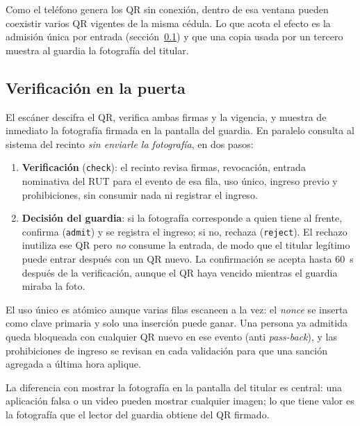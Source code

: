 Como el teléfono genera los QR sin conexión, dentro de esa ventana pueden coexistir varios QR
vigentes de la misma cédula. Lo que acota el efecto es la admisión única por entrada
(sección~\ref{sec:prototipo-verificacion}) y que una copia usada por un tercero muestra al guardia
la fotografía del titular.

\subsection{Verificación en la puerta}
\label{sec:prototipo-verificacion}

El escáner descifra el QR, verifica ambas firmas y la vigencia, y muestra de inmediato la
fotografía firmada en la pantalla del guardia. En paralelo consulta al sistema del recinto
\emph{sin enviarle la fotografía}, en dos pasos:

\begin{enumerate}
  \item \textbf{Verificación} (\texttt{check}): el recinto revisa firmas, revocación, entrada
        nominativa del RUT para el evento de esa fila, uso único, ingreso previo y prohibiciones, sin
        consumir nada ni registrar el ingreso.
  \item \textbf{Decisión del guardia}: si la fotografía corresponde a quien tiene al frente, confirma
        (\texttt{admit}) y se registra el ingreso; si no, rechaza (\texttt{reject}). El rechazo
        inutiliza ese QR pero \emph{no} consume la entrada, de modo que el titular legítimo puede
        entrar después con un QR nuevo. La confirmación se acepta hasta 60~s después de la
        verificación, aunque el QR haya vencido mientras el guardia miraba la foto.
\end{enumerate}

El uso único es atómico aunque varias filas escaneen a la vez: el \emph{nonce} se inserta como
clave primaria y solo una inserción puede ganar. Una persona ya admitida queda bloqueada con
cualquier QR nuevo en ese evento (anti \emph{pass-back}), y las prohibiciones de ingreso se revisan
en cada validación para que una sanción agregada a última hora aplique.

La diferencia con mostrar la fotografía en la pantalla del titular es central: una aplicación
falsa o un video pueden mostrar cualquier imagen; lo que tiene valor es la fotografía que el lector
del guardia obtiene del QR firmado.

